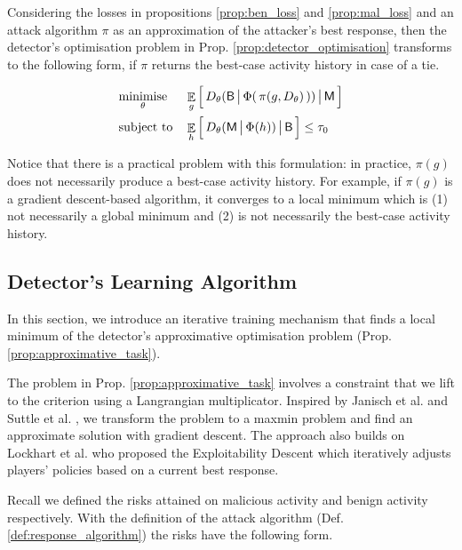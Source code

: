 \begin{proposition}\label{prop:approximative_task}
    Considering the losses in propositions \ref{prop:ben_loss} and \ref{prop:mal_loss} and an attack algorithm $\pi$ as an approximation of the attacker's best response, then the detector's optimisation problem in Prop.  \ref{prop:detector_optimisation} transforms to the following form, if $\pi$ returns the best-case activity history in case of a tie.

    \begin{equation*}
        \begin{aligned}
        & \underset{\theta} {\text{minimise}}
        & & \mathop{\mathbb{E}}_g \Big[\, D_\theta(\mathsf{B} \,\big|\, \Phi ( \, \pi(g, D_\theta) \, )) \,\big|\, \mathsf{M} \,\Big] \\
        & \text{subject to}
        & & \mathop{\mathbb{E}}_{h} \Big[\, D_\theta(\mathsf{M} \,\big|\, \Phi (h)) \,\big|\, \mathsf{B} \,\Big] \le \tau_0 \\
        \end{aligned}
    \end{equation*}
\end{proposition}

Notice that there is a practical problem with this formulation: in practice, $\pi(g)$ does not necessarily produce a best-case activity history. For example, if $\pi(g)$ is a gradient descent-based algorithm, it converges to a local minimum which is (1) not necessarily a global minimum and (2) is not necessarily the best-case activity history.

\subsection{Detector's Learning Algorithm}\label{sec:detector_learning_algorithm}
In this section, we introduce an iterative training mechanism that finds a local minimum of the detector's approximative optimisation problem (Prop. \ref{prop:approximative_task}).

The problem in Prop. \ref{prop:approximative_task} involves a constraint that we lift to the criterion using a Langrangian multiplicator. Inspired by Janisch et al. \cite{lambda_trick} and Suttle et al. \cite{learning_rate}, we transform the problem to a maxmin problem and find an approximate solution with gradient descent. The approach also builds on Lockhart et al. \cite{exploitability_descent} who proposed the Exploitability Descent which iteratively adjusts players' policies based on a current best response.

Recall we defined the risks attained on malicious activity and benign activity respectively. With the definition of the attack algorithm (Def. \ref{def:response_algorithm}) the risks have the following form.


